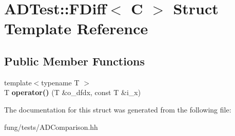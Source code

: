 \hypertarget{structADTest_1_1FDiff}{\section{A\-D\-Test\-:\-:F\-Diff$<$ C $>$ Struct Template Reference}
\label{structADTest_1_1FDiff}
}
\subsection*{Public Member Functions}
\begin{DoxyCompactItemize}
\item 
\hypertarget{structADTest_1_1FDiff_a893adec36a22c8c6da5c4503875d9390}{{\footnotesize template$<$typename T $>$ }\\T {\bfseries operator()} (T \&o\-\_\-dfdx, const T \&i\-\_\-x)}\label{structADTest_1_1FDiff_a893adec36a22c8c6da5c4503875d9390}

\end{DoxyCompactItemize}


The documentation for this struct was generated from the following file\-:\begin{DoxyCompactItemize}
\item 
fung/tests/A\-D\-Comparison.\-hh\end{DoxyCompactItemize}
